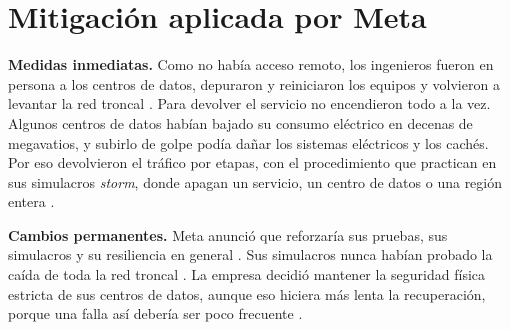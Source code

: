 \section{Mitigación aplicada por Meta}

\textbf{Medidas inmediatas.} Como no había acceso remoto, los ingenieros fueron en persona a los centros de datos, depuraron y reiniciaron los equipos y volvieron a levantar la red troncal \cite{meta_detalles}. Para devolver el servicio no encendieron todo a la vez. Algunos centros de datos habían bajado su consumo eléctrico en decenas de megavatios, y subirlo de golpe podía dañar los sistemas eléctricos y los cachés. Por eso devolvieron el tráfico por etapas, con el procedimiento que practican en sus simulacros \emph{storm}, donde apagan un servicio, un centro de datos o una región entera \cite{meta_detalles}.

\textbf{Cambios permanentes.} Meta anunció que reforzaría sus pruebas, sus simulacros y su resiliencia en general \cite{meta_detalles}. Sus simulacros nunca habían probado la caída de toda la red troncal \cite{meta_detalles}. La empresa decidió mantener la seguridad física estricta de sus centros de datos, aunque eso hiciera más lenta la recuperación, porque una falla así debería ser poco frecuente \cite{meta_detalles}.

